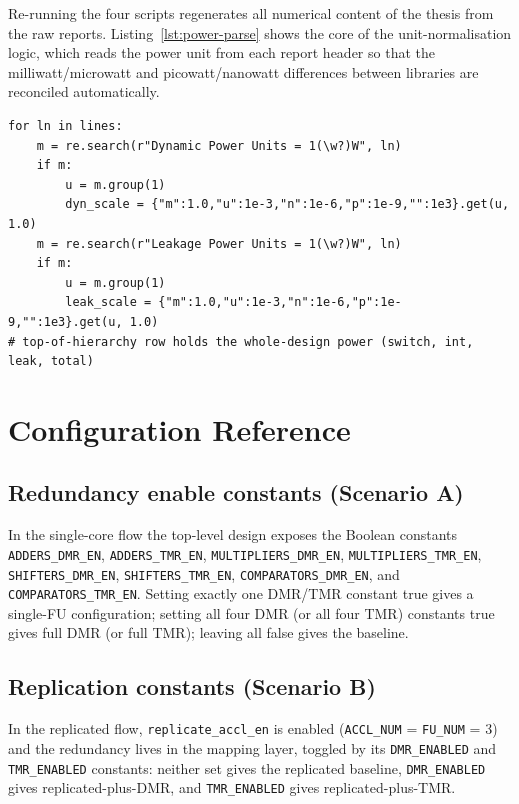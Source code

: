 Re-running the four scripts regenerates all numerical content of the thesis from
the raw reports. Listing~\ref{lst:power-parse} shows the core of the
unit-normalisation logic, which reads the power unit from each report header so
that the milliwatt/microwatt and picowatt/nanowatt differences between libraries
are reconciled automatically.

\begin{lstlisting}[language=mypython, caption={Power-unit normalisation in \texttt{parse\_synth.py} (excerpt).}, label={lst:power-parse}]
for ln in lines:
    m = re.search(r"Dynamic Power Units = 1(\w?)W", ln)
    if m:
        u = m.group(1)
        dyn_scale = {"m":1.0,"u":1e-3,"n":1e-6,"p":1e-9,"":1e3}.get(u, 1.0)
    m = re.search(r"Leakage Power Units = 1(\w?)W", ln)
    if m:
        u = m.group(1)
        leak_scale = {"m":1.0,"u":1e-3,"n":1e-6,"p":1e-9,"":1e3}.get(u, 1.0)
# top-of-hierarchy row holds the whole-design power (switch, int, leak, total)
\end{lstlisting}

\chapter{Configuration Reference}
\label{app:config}

\section{Redundancy enable constants (Scenario A)}

In the single-core flow the top-level design exposes the Boolean constants
\texttt{ADDERS\_DMR\_EN}, \texttt{ADDERS\_TMR\_EN}, \texttt{MULTIPLIERS\_DMR\_EN},
\texttt{MULTIPLIERS\_TMR\_EN}, \texttt{SHIFTERS\_DMR\_EN},
\texttt{SHIFTERS\_TMR\_EN}, \texttt{COMPARATORS\_DMR\_EN}, and
\texttt{COMPARATORS\_TMR\_EN}. Setting exactly one DMR/TMR constant true gives a
single-FU configuration; setting all four DMR (or all four TMR) constants true
gives full DMR (or full TMR); leaving all false gives the baseline.

\section{Replication constants (Scenario B)}

In the replicated flow, \texttt{replicate\_accl\_en} is enabled
(\texttt{ACCL\_NUM} = \texttt{FU\_NUM} = 3) and the redundancy lives in the
mapping layer, toggled by its \texttt{DMR\_ENABLED} and \texttt{TMR\_ENABLED}
constants: neither set gives the replicated baseline, \texttt{DMR\_ENABLED} gives
replicated-plus-DMR, and \texttt{TMR\_ENABLED} gives replicated-plus-TMR.

